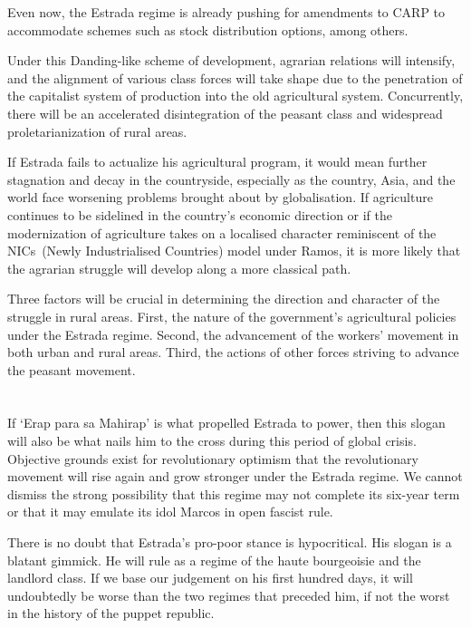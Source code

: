 Even now, the Estrada regime is already pushing for amendments to CARP to 
accommodate schemes such as stock distribution options, among others.

Under this Danding-like scheme of development, agrarian relations will 
intensify, and the alignment of various class forces will take shape due to 
the penetration of the capitalist system of production into the old 
agricultural system. 
Concurrently, there will be an accelerated disintegration of the peasant class 
and widespread proletarianization of rural areas.

If Estrada fails to actualize his agricultural program, it would mean 
further stagnation and decay in the countryside, especially as the country, 
Asia, and the world face worsening problems brought about by globalisation. 
If agriculture continues to be sidelined in the country's economic direction 
or if the modernization of agriculture takes on a localised character 
reminiscent of the NICs~(Newly Industrialised Countries) model under Ramos, 
it is more likely that the agrarian struggle will develop along 
a more classical path.

Three factors will be crucial in determining the direction and character of 
the struggle in rural areas. 
First, the nature of the government's agricultural 
policies under the Estrada regime. 
Second, the advancement of the workers' movement in both urban and rural areas. 
Third, the actions of other forces striving to advance the peasant movement.


\section{}
If `Erap para sa Mahirap' is what propelled Estrada to power, 
then this slogan will also be what nails him to the cross during 
this period of global crisis. 
Objective grounds exist for revolutionary optimism that the revolutionary 
movement will rise again and grow stronger under the Estrada regime. 
We cannot dismiss the strong possibility that this regime may not complete 
its six-year term or that it may emulate its idol Marcos in open fascist rule.

There is no doubt that Estrada's pro-poor stance is hypocritical. 
His slogan is a blatant gimmick. 
He will rule as a regime of the haute bourgeoisie and the landlord class. 
If we base our judgement on his first hundred days, 
it will undoubtedly be worse than the two regimes that preceded him, 
if not the worst in the history of the puppet republic.

